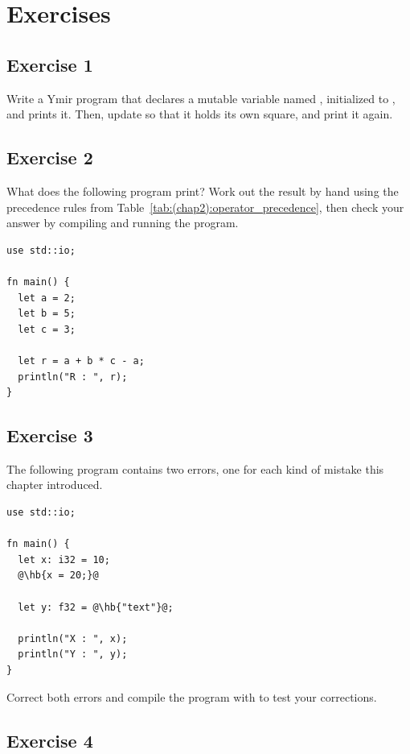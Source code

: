 \vfill%
\pagebreak

\section*{Exercises}
%
\subsection*{Exercise 1}

Write a Ymir program that declares a mutable  variable named
, initialized to , and prints it. Then, update
 so that it holds its own square, and print it again.

\subsection*{Exercise 2}

What does the following program print? Work out the result by hand using the
precedence rules from Table~\ref{tab:(chap2):operator_precedence}, then check
your answer by compiling and running the program.

\begin{lstlisting}[style=coloredverbatim]
use std::io;

fn main() {
  let a = 2;
  let b = 5;
  let c = 3;

  let r = a + b * c - a;
  println("R : ", r);
}
\end{lstlisting}

\subsection*{Exercise 3}

The following program contains two errors, one for each kind of mistake this
chapter introduced.

\begin{lstlisting}[style=coloredverbatimError, escapechar=@, caption=Ymir program with errors]
use std::io;

fn main() {
  let x: i32 = 10;
  @\hb{x = 20;}@

  let y: f32 = @\hb{"text"}@;

  println("X : ", x);
  println("Y : ", y);
}
\end{lstlisting}

Correct both errors and compile the program with  to test your
corrections.

\subsection*{Exercise 4}

